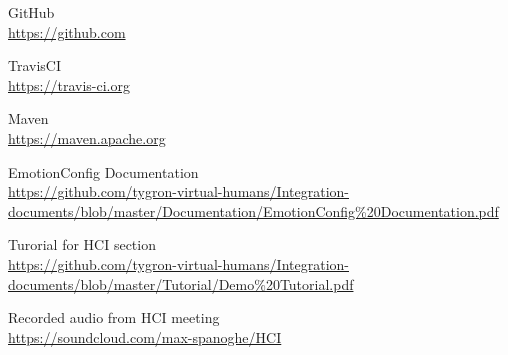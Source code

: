 \documentclass[11pt]{article}
\begin{document}
\begin{thebibliography}{9}
	GitHub\\
	\url{https://github.com}
	
	TravisCI\\
	\url{https://travis-ci.org}
	
	Maven\\
	\url{https://maven.apache.org}
	
	EmotionConfig Documentation\\
	\url{https://github.com/tygron-virtual-humans/Integration-documents/blob/master/Documentation/EmotionConfig\%20Documentation.pdf}
		
	Turorial for HCI section\\
	\url{https://github.com/tygron-virtual-humans/Integration-documents/blob/master/Tutorial/Demo\%20Tutorial.pdf}
	
	Recorded audio from HCI meeting\\
	\url{https://soundcloud.com/max-spanoghe/HCI}

	
	
\end{thebibliography}
\end{document}
